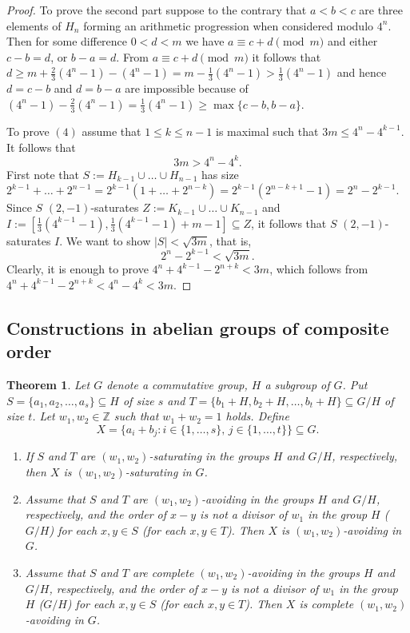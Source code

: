 \documentclass[11pt]{article}
\numberwithin{table}{section}
\newtheorem{theorem}{Theorem}[section]
\theoremstyle{definition}
\begin{document}
\begin{proof}
		To prove the second part suppose to the contrary that $a<b<c$ are three elements of $H_n$ forming an arithmetic progression when considered modulo $4^n$.
		Then for some difference $0<d<m$ we have $a\equiv c+d \pmod m$ and 
		either $c-b=d$, or $b-a=d$. 
		From $a\equiv c+d \pmod m$ it follows that 
		$d \geq m+\frac23(4^n-1)-(4^n-1)=m-\frac13(4^n-1)> \frac13(4^n-1) $ and hence $d=c-b$ and $d=b-a$ are impossible because of $(4^n-1)-\frac23(4^n-1)=\frac13(4^n-1) \geq \max\{c-b,b-a\}$.
		
		To prove $(4)$ assume that $1 \leq k \leq n-1$ is maximal such that 
		$3m \leq 4^n-4^{k-1}$. It follows that 
		\[3m > 4^n-4^k.\]
		First note that $S:=H_{k-1}\cup\ldots \cup H_{n-1}$ has size $2^{k-1}+\ldots+2^{n-1}=2^{k-1}(1+\ldots+2^{n-k})=2^{k-1}(2^{n-k+1}-1)=2^n-2^{k-1}$. Since $S$ $(2,-1)$-saturates $Z:=K_{k-1}\cup \ldots \cup K_{n-1}$ and 
		$I:=[\frac13(4^{k-1}-1),\frac13(4^{k-1}-1)+m-1]\subseteq Z$, it follows that $S$ $(2,-1)$-saturates $I$. We want to show $|S|< \sqrt{3m}$, that is,
		\[2^n-2^{k-1}<\sqrt{3m}.\]
		Clearly, it is enough to prove $4^n+4^{k-1}-2^{n+k}< 3m$, which follows from $4^n+4^{k-1}-2^{n+k}< 4^n-4^k < 3m$. 
	\end{proof}
	
	\subsection{Constructions in abelian groups of composite order}
	\label{last}
	
	
	
	
	
	\begin{theorem}
		Let $G$ denote a commutative group, $H$ a subgroup of $G$. Put $S=\{a_1,a_2,\ldots,a_s\} \subseteq H$ of size $s$ and $T=\{b_1+H,b_2+H,\ldots,b_t+H\} \subseteq G/H$ of size $t$. Let $w_1, w_2 \in \mathbb{Z}$ such that
		$w_1+w_2=1$ holds. 
		Define
		\[X=\{a_i + b_j : i\in \{1,\ldots,s\},\, j \in\{1,\ldots,t\}\} \subseteq G.\]
		\begin{enumerate}[\rm(1)]
			\item If $S$ and $T$ are $(w_1,w_2)$-saturating in the groups $H$ and $G/H$, respectively, then
			$X$ is $(w_1,w_2)$-saturating in $G$.
			\item Assume that $S$ and $T$ are $(w_1,w_2)$-avoiding in the groups $H$ and $G/H$, respectively, and the order of $x-y$ is not a divisor of $w_1$ in the group $H$ ($G/H$) for each $x,y\in S$ (for each $x,y \in T$). Then $X$ is $(w_1,w_2)$-avoiding in $G$.
			\item Assume that $S$ and $T$ are complete $(w_1,w_2)$-avoiding in the groups $H$ and $G/H$, respectively, and the order of $x-y$ is not a divisor of $w_1$ in the group $H$ ($G/H$) for each $x,y\in S$ (for each $x,y \in T$). Then $X$ is complete $(w_1,w_2)$-avoiding in $G$.
		\end{enumerate}
	\end{theorem}
	
\end{document}
